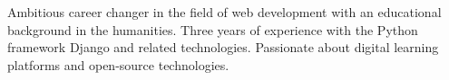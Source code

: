 
\begin{cvparagraph}

  Ambitious career changer in the field of web development with an educational background in the humanities.
  Three years of experience with the Python framework Django and related technologies.
  Passionate about digital learning platforms and open-source technologies.
\end{cvparagraph}
